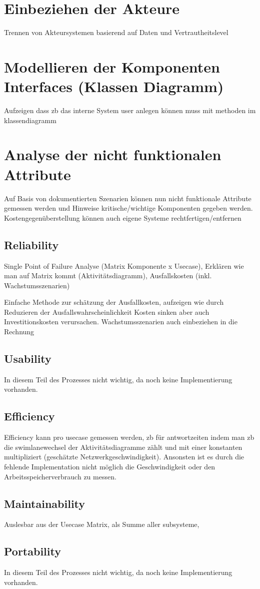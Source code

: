\section{Einbeziehen der Akteure}
Trennen von Akteursystemen basierend auf Daten und Vertrautheitslevel

\section{Modellieren der Komponenten Interfaces (Klassen Diagramm)}
Aufzeigen dass zb das interne System user anlegen können muss mit methoden im klassendiagramm

\section{Analyse der nicht funktionalen Attribute}
Auf Basis von dokumentierten Szenarien können nun nicht funktionale Attribute gemessen werden und Hinweise kritische/wichtige Komponenten gegeben werden. Kostengegenüberstellung können auch eigene Systeme rechtfertigen/entfernen

\subsection{Reliability}
Single Point of Failure Analyse (Matrix Komponente x Usecase), Erklären wie man auf Matrix kommt (Aktivitätsdiagramm), Ausfallskosten (inkl. Wachstumsszenarien)

Einfache Methode zur schätzung der Ausfallkosten, aufzeigen wie durch Reduzieren der Ausfallswahrscheinlichkeit Kosten sinken aber auch Investitionskosten verursachen. Wachstumsszenarien auch einbeziehen in die Rechnung
\subsection{Usability}
In diesem Teil des Prozesses nicht wichtig, da noch keine Implementierung vorhanden.

\subsection{Efficiency}
Efficiency kann pro usecase gemessen werden, zb für antwortzeiten indem man zb die swimlanewechsel der Aktivitätsdiagramme zählt und mit einer konstanten multipliziert (geschätzte Netzwerkgeschwindigkeit). Ansonsten ist es durch die fehlende Implementation nicht möglich die Geschwindigkeit oder den Arbeitsspeicherverbrauch zu messen.

\subsection{Maintainability}
Auslesbar aus der Usecase Matrix, als Summe aller subsysteme,

\subsection{Portability}
In diesem Teil des Prozesses nicht wichtig, da noch keine Implementierung vorhanden.
